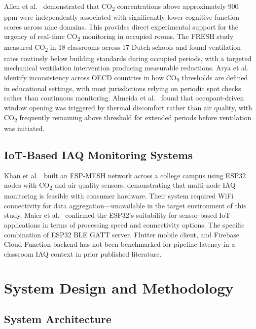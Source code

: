 \documentclass[12pt, a4paper]{article}
\begin{document}
Allen et al.~\cite{allen2016} demonstrated that CO\textsubscript{2}
concentrations above approximately 900\,ppm were independently
associated with significantly lower cognitive function scores across
nine domains. This provides direct experimental support for the urgency
of real-time CO\textsubscript{2} monitoring in occupied rooms. The
FRESH study~\cite{fresh2013} measured CO\textsubscript{2} in 18
classrooms across 17 Dutch schools and found ventilation rates
routinely below building standards during occupied periods, with a
targeted mechanical ventilation intervention producing measurable
reductions. Arya et al.~\cite{arya2024} identify inconsistency across
OECD countries in how CO\textsubscript{2} thresholds are defined in
educational settings, with most jurisdictions relying on periodic spot
checks rather than continuous monitoring. Almeida et
al.~\cite{almeida2017} found that occupant-driven window opening was
triggered by thermal discomfort rather than air quality, with
CO\textsubscript{2} frequently remaining above threshold for extended
periods before ventilation was initiated.

\subsection{IoT-Based IAQ Monitoring Systems}

Khan et al.~\cite{khan2022} built an ESP-MESH network across a college
campus using ESP32 nodes with CO\textsubscript{2} and air quality
sensors, demonstrating that multi-node IAQ monitoring is feasible with
consumer hardware. Their system required WiFi connectivity for data
aggregation---unavailable in the target environment of this study.
Maier et al.~\cite{maier2017} confirmed the ESP32's suitability for
sensor-based IoT applications in terms of processing speed and
connectivity options. The specific combination of ESP32 BLE GATT
server, Flutter mobile client, and Firebase Cloud Function backend has
not been benchmarked for pipeline latency in a classroom IAQ context
in prior published literature.

\section{System Design and Methodology}

\subsection{System Architecture}
\end{document}
